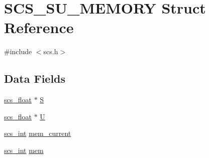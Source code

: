 \hypertarget{struct_s_c_s___s_u___m_e_m_o_r_y}{\section{S\-C\-S\-\_\-\-S\-U\-\_\-\-M\-E\-M\-O\-R\-Y Struct Reference}
\label{struct_s_c_s___s_u___m_e_m_o_r_y}
}


{\ttfamily \#include $<$scs.\-h$>$}

\subsection*{Data Fields}
\begin{DoxyCompactItemize}
\item 
\hyperlink{glbopts_8h_ad37836e6404bb2c3ae8adcc6290699b9}{scs\-\_\-float} $\ast$ \hyperlink{struct_s_c_s___s_u___m_e_m_o_r_y_aac89225fdd99a98b9e209a434a7fd037}{S}
\item 
\hyperlink{glbopts_8h_ad37836e6404bb2c3ae8adcc6290699b9}{scs\-\_\-float} $\ast$ \hyperlink{struct_s_c_s___s_u___m_e_m_o_r_y_a2597c54d6bdb9c4950b1c214f5b7f9f3}{U}
\item 
\hyperlink{glbopts_8h_a23c48a83ce0c58783595ad45ffcaf76b}{scs\-\_\-int} \hyperlink{struct_s_c_s___s_u___m_e_m_o_r_y_a8ff7e7d7b7c9aafbc1b230a62edec9d7}{mem\-\_\-current}
\item 
\hyperlink{glbopts_8h_a23c48a83ce0c58783595ad45ffcaf76b}{scs\-\_\-int} \hyperlink{struct_s_c_s___s_u___m_e_m_o_r_y_a2adf52e26eab40e526b88f0576713bad}{mem}
\end{DoxyCompactItemize}


